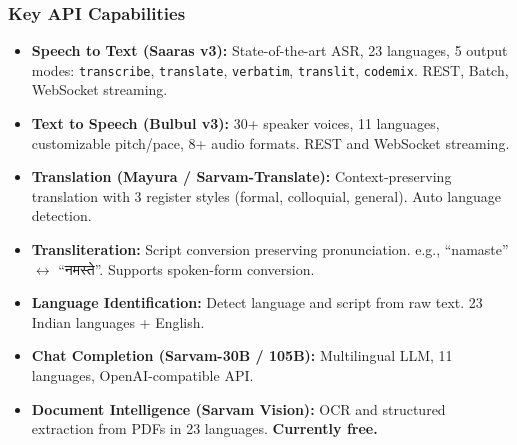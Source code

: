 \begin{frame}[fragile]\frametitle{Key API Capabilities}
  \begin{itemize}
    \item \textbf{Speech to Text (Saaras v3):} State-of-the-art ASR, 23 languages, 5 output modes: \texttt{transcribe}, \texttt{translate}, \texttt{verbatim}, \texttt{translit}, \texttt{codemix}. REST, Batch, WebSocket streaming.
    \item \textbf{Text to Speech (Bulbul v3):} 30+ speaker voices, 11 languages, customizable pitch/pace, 8+ audio formats. REST and WebSocket streaming.
    \item \textbf{Translation (Mayura / Sarvam-Translate):} Context-preserving translation with 3 register styles (formal, colloquial, general). Auto language detection.
    \item \textbf{Transliteration:} Script conversion preserving pronunciation. e.g., ``namaste'' $\leftrightarrow$ ``नमस्ते''. Supports spoken-form conversion.
    \item \textbf{Language Identification:} Detect language and script from raw text. 23 Indian languages + English.
    \item \textbf{Chat Completion (Sarvam-30B / 105B):} Multilingual LLM, 11 languages, OpenAI-compatible API.
    \item \textbf{Document Intelligence (Sarvam Vision):} OCR and structured extraction from PDFs in 23 languages. \textbf{Currently free.}
  \end{itemize}
\end{frame}

